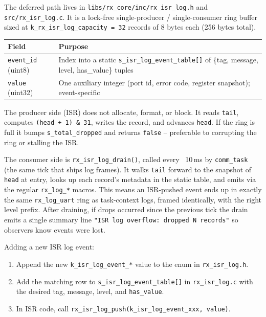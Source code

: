 The deferred path lives in
\texttt{libs/rx\_core/inc/rx\_isr\_log.h} and \texttt{src/rx\_isr\_log.c}.
It is a lock-free single-producer / single-consumer ring buffer
sized at \texttt{k\_rx\_isr\_log\_capacity = 32} records of 8 bytes
each (256 bytes total).

\begin{center}
\begin{tabular}{|l|p{10cm}|}
\hline
\textbf{Field}              & \textbf{Purpose}                                                                                                  \\
\hline
\texttt{event\_id} (uint8)  & Index into a static \texttt{s\_isr\_log\_event\_table[]} of \{tag, message, level, has\_value\} tuples            \\
\texttt{value} (uint32)     & One auxiliary integer (port id, error code, register snapshot); event-specific                                    \\
\hline
\end{tabular}
\end{center}

The producer side (ISR) does not allocate, format, or block. It reads
\texttt{tail}, computes \texttt{(head + 1) \& 31}, writes the record,
and advances \texttt{head}. If the ring is full it bumps
\texttt{s\_total\_dropped} and returns \texttt{false} -- preferable
to corrupting the ring or stalling the ISR.

The consumer side is \texttt{rx\_isr\_log\_drain()}, called every
~10\,ms by \texttt{comm\_task} (the same tick that ships log frames).
It walks \texttt{tail} forward to the snapshot of \texttt{head} at
entry, looks up each record's metadata in the static table, and emits
via the regular \texttt{rx\_log\_*} macros. This means an ISR-pushed
event ends up in exactly the same \texttt{rx\_log\_uart} ring as
task-context logs, framed identically, with the right level prefix.
After draining, if drops occurred since the previous tick the drain
emits a single summary line \texttt{"ISR log overflow: dropped N
records"} so observers know events were lost.

Adding a new ISR log event:

\begin{enumerate}
  \item Append the new \texttt{k\_isr\_log\_event\_*} value to the
        enum in \texttt{rx\_isr\_log.h}.
  \item Add the matching row to
        \texttt{s\_isr\_log\_event\_table[]} in \texttt{rx\_isr\_log.c}
        with the desired tag, message, level, and \texttt{has\_value}.
  \item In ISR code, call
        \texttt{rx\_isr\_log\_push(k\_isr\_log\_event\_xxx, value)}.
\end{enumerate}

